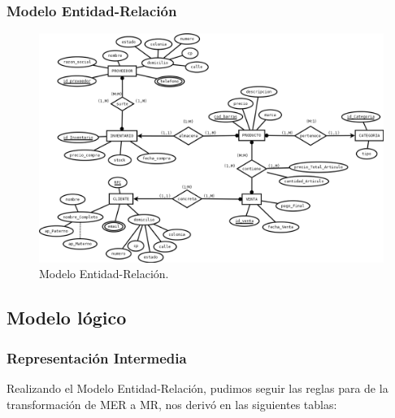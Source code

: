 \documentclass[12pt,letterpaper]{article}
\begin{document}
			\subsubsection{Modelo Entidad-Relación}
			\begin{figure}[H]
				\centering
				\includegraphics[width=\linewidth]{img/MER}
				\caption{Modelo Entidad-Relación.}
			\end{figure}
			
			
		\subsection{Modelo lógico}
			\subsubsection{Representación Intermedia}
				Realizando el Modelo Entidad-Relación, pudimos seguir las reglas para de la transformación de
				MER a MR, nos derivó en las siguientes tablas:
				
\end{document}
